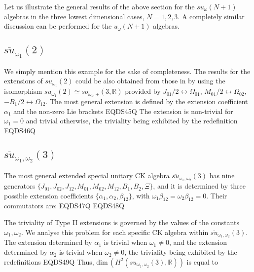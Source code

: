 \documentclass[12pt]{article}
\begin{document}
Let us illustrate the general results of the above section for the
${su}_{\omega}(N+1)$ algebras in the three lowest dimensional cases,
$N=1,2,3$. A completely similar discussion can be performed for the
${u}_{\omega}(N+1)$ algebras.

\subsection{$\overline{su}_{{\omega}_1}(2)$ }

We simply mention this example for the sake of completeness. The
results for the extensions of ${su}_{{\omega}_1}(2)$ could be also obtained
from those in
\cite{Azc.Her.Bue.San:96}
by using the isomorphism ${su}_{{\omega}_1}(2) \simeq so_{{\omega}_1, +
}(3,
{{\mathbb R}})$ provided by
${J}_{01}/2 \leftrightarrow \Omega_{01}$,
${M}_{01}/2 \leftrightarrow \Omega_{02}$,
$-{B}_{1}/2 \leftrightarrow \Omega_{12}$.
The most general extension is defined
by the extension coefficient ${\alpha}_{1}$
and the non-zero Lie brackets
EQDS45Q
The extension is non-trivial for ${\omega}_1 = 0$ and trivial otherwise, the
triviality being exhibited by the redefinition
EQDS46Q

\subsection{$\overline{su}_{{\omega}_1,{\omega}_2}(3)$ }

The most general extended  special unitary CK algebra
$\overline{su}_{{\omega}_1,{\omega}_2}(3)$  has nine generators
$\{{J}_{01},{J}_{02},{J}_{12}, {M}_{01},{M}_{02},{M}_{12},
{B}_{1},{B}_{2},\Xi\}$, and it is determined by three possible extension
coefficients $\{{\alpha}_{1}, {\alpha}_{2}, {\beta}_{12}\}$, with
${\omega}_1{\beta}_{12}={\omega}_2{\beta}_{12}=0$.  Their  commutators are:
EQDS47Q
EQDS48Q

The triviality of Type II extensions is governed by the values of the
constants ${\omega}_1,{\omega}_2$. We analyse this problem for each specific CK
algebra within $\overline{su}_{{\omega}_1,{\omega}_2}(3)$. The extension
determined by ${\alpha}_{1}$ is trivial when ${\omega}_1 \neq 0$, and the
extension determined by ${\alpha}_{2}$ is trivial when ${\omega}_2 \neq 0$, the
triviality being exhibited by the redefinitions
EQDS49Q
Thus, ${\mbox{dim}}\, (H^2({su}_{{\omega}_1, {\omega}_2}(3),{{\mathbb R}}))$  is equal to
\end{document}
